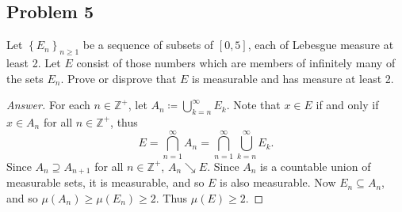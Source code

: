 \documentclass[12pt]{article}
\newcommand{\z}{\mathbb{Z}}
\newcommand\paren[1]{\left( #1 \right)}
\newcommand\setb[1]{\left \{ #1 \right \}}
\theoremstyle{definition}
\begin{document}
\subsection{Problem 5 \texorpdfstring{\cite{SS}}{}}
Let $\setb{ E_n }_{n \geq 1}$ be a sequence of subsets of $[0,5]$, each of Lebesgue measure at least 2. Let $E$ consist of those numbers which are members of infinitely many of the sets $E_n$. Prove or disprove that $E$ is measurable and has measure at least 2.
\begin{proof}[Answer]
    For each $n \in \z^+$, let $A_n \coloneqq \bigcup\limits_{k = n}^{\infty} E_k$. Note that $x \in E$ if and only if $x \in A_n$ for all $n \in \z^+$, thus
    \[
        E = \bigcap\limits_{n = 1}^{\infty} A_n = \bigcap\limits_{n = 1}^{\infty} \bigcup\limits_{k = n}^{\infty} E_k.
    \]
    Since $A_n \supseteq A_{n+1}$ for all $n \in \z^+$, $A_n \searrow E$. Since $A_n$ is a countable union of measurable sets, it is measurable, and so $E$ is also measurable. Now $E_n \subseteq A_n$, and so $\mu \paren{ A_n } \geq \mu \paren{ E_n } \geq 2$. Thus $\mu(E) \geq 2$.
\end{proof}
\end{document}
